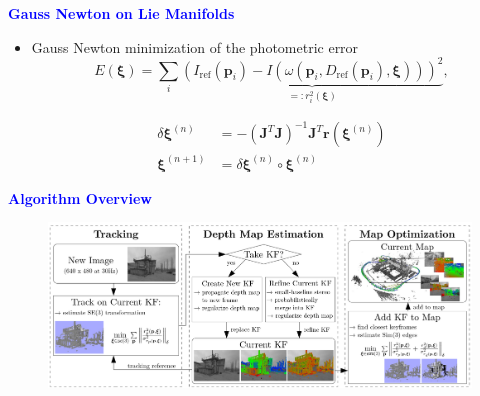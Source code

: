 \documentclass[aspectratio=169]{beamer}
\begin{document}
\begin{frame}{\textcolor{blue}{\textbf{Gauss Newton on Lie Manifolds}}}
	\vspace{-0.5cm}
	\begin{block}{\textbf{\textcolor{teal}{}}}
	\begin{itemize}
			\item Gauss Newton minimization of the photometric error
			\begin{equation}
				E(\boldsymbol{\xi})=\sum_i \underbrace{\left(I_{\mathrm{ref}}\left(\mathbf{p}_i\right)-I\left(\omega\left(\mathbf{p}_i, D_{\mathrm{ref}}\left(\mathbf{p}_i\right), \boldsymbol{\xi}\right)\right)\right)^2}_{=: r_i^2(\boldsymbol{\xi})},
			\end{equation}
			
			\begin{equation}
				\begin{aligned}
					\delta \boldsymbol{\xi}^{(n)}&=-\left(\mathbf{J}^T \mathbf{J}\right)^{-1} \mathbf{J}^T \mathbf{r}\left(\boldsymbol{\xi}^{(n)}\right)\\
					\boldsymbol{\xi}^{(n+1)}&=\delta \boldsymbol{\xi}^{(n)} \circ \boldsymbol{\xi}^{(n)}
				\end{aligned}
			\end{equation}

	\end{itemize}

	\end{block}

\end{frame}

\begin{frame}{\textcolor{blue}{\textbf{Algorithm Overview}}}
	\vspace{-0.5cm}
	\begin{figure}
		\centering
		\includegraphics[height=0.6\textheight]{pics/algorithm_lsd_slam.png}
	\end{figure}
\end{frame}
\end{document}
